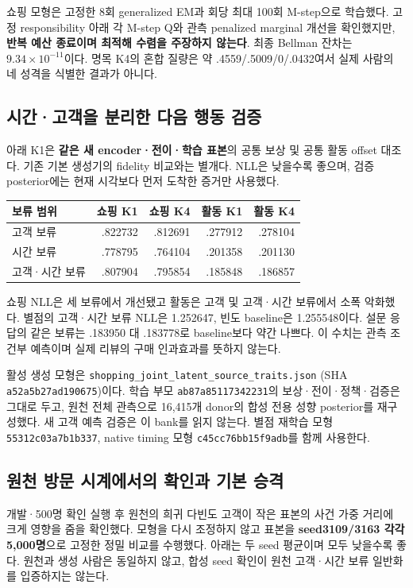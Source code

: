 \documentclass[11pt,a4paper]{article}
\newcommand{\code}[1]{{\ttfamily\footnotesize\nolinkurl{#1}}}
\newcommand{\note}[1]{\par\noindent\colorbox{pale}{\parbox{\dimexpr\linewidth-2\fboxsep}{\small #1}}\par}
\newcommand{\page}{\clearpage}
\newcommand{\thead}{\rowcolor{pale}}
\begin{document}
쇼핑 모형은 고정한 8회 generalized EM과 회당 최대 100회 M-step으로 학습했다. 고정 responsibility 아래 각 M-step Q와 관측 penalized marginal 개선을 확인했지만, \textbf{반복 예산 종료이며 최적해 수렴을 주장하지 않는다}. 최종 Bellman 잔차는 $9.34\times10^{-11}$이다. 명목 K4의 혼합 질량은 약 .4559/.5009/0/.0432여서 실제 사람의 네 성격을 식별한 결과가 아니다.

\subsection{시간·고객을 분리한 다음 행동 검증}
아래 K1은 \textbf{같은 새 encoder·전이·학습 표본}의 공통 보상 및 공통 활동 offset 대조다. 기존 기본 생성기의 fidelity 비교와는 별개다. NLL은 낮을수록 좋으며, 검증 posterior에는 현재 시각보다 먼저 도착한 증거만 사용했다.

\begin{tabularx}{\linewidth}{@{}Yrrrr@{}}
\thead 보류 범위 & 쇼핑 K1 & 쇼핑 K4 & 활동 K1 & 활동 K4\\\midrule
고객 보류 & .822732 & .812691 & .277912 & .278104\\
시간 보류 & .778795 & .764104 & .201358 & .201130\\
고객·시간 보류 & .807904 & .795854 & .185848 & .186857\\\bottomrule
\end{tabularx}

쇼핑 NLL은 세 보류에서 개선됐고 활동은 고객 및 고객·시간 보류에서 소폭 악화했다. 별점의 고객·시간 보류 NLL은 1.252647, 빈도 baseline은 1.255548이다. 설문 응답의 같은 보류는 .183950 대 .183778로 baseline보다 약간 나쁘다. 이 수치는 관측 조건부 예측이며 실제 리뷰의 구매 인과효과를 뜻하지 않는다.

\note{활성 생성 모형은 \code{shopping_joint_latent_source_traits.json} (SHA \code{a52a5b27ad190675})이다. 학습 부모 \code{ab87a85117342231}의 보상·전이·정책·검증은 그대로 두고, 원천 전체 관측으로 16,415개 donor의 합성 전용 성향 posterior를 재구성했다. 새 고객 예측 검증은 이 bank를 읽지 않는다. 별점 재학습 모형 \code{55312c03a7b1b337}, native timing 모형 \code{c45cc76bb15f9adb}를 함께 사용한다.}

\page
\subsection{원천 방문 시계에서의 확인과 기본 승격}
개발·500명 확인 실행 후 원천의 희귀 다빈도 고객이 작은 표본의 사건 가중 거리에 크게 영향을 줌을 확인했다. 모형을 다시 조정하지 않고 표본을 \textbf{seed3109/3163 각각 5,000명}으로 고정한 정밀 비교를 수행했다. 아래는 두 seed 평균이며 모두 낮을수록 좋다. 원천과 생성 사람은 동일하지 않고, 합성 seed 확인이 원천 고객·시간 보류 일반화를 입증하지는 않는다.
\end{document}

